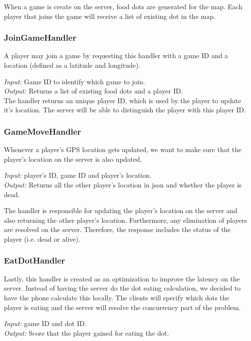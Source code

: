\documentclass{acm_proc_article-sp}
\begin{document}
When a game is create on the server, food dots are generated for the
map. Each player that joins the game will receive a list of existing
dot in the map.

\subsubsection{JoinGameHandler}
A player may join a game by requesting this handler with a game ID and
a location (defined as a latitude and longitude).

\emph{Input:} Game ID to identify which game to join.\\
\emph{Output:} Returns a list of existing food dots and a player ID.\\

The handler returns an unique player ID, which is used by the player
to update it's location. The server will be able to distinguish the
player with this player ID.

\subsubsection{GameMoveHandler}
Whenever a player's GPS location gets updated, we want to make sure
that the player's location on the server is also updated.

\emph{Input:} player's ID, game ID and player's location.\\
\emph{Output:} Returns all the other player's location in json and
whether the player is dead.

The handler is responsible for updating the player's location on the
server and also returning the other player's location. Furthermore,
any elimination of players are resolved on the server. Therefore, the
response includes the status of the player (i.e. dead or alive).

\subsubsection{EatDotHandler}
Lastly, this handler is created as an optimization to improve the
latency on the server. Instead of having the server do the dot eating
calculation, we decided to have the phone calculate this locally. The
clients will specify which dots the player is eating and the server
will resolve the concurrency part of the problem.

\emph{Input:} game ID and dot ID.\\
\emph{Output:} Score that the player gained for eating the dot.
\end{document}
